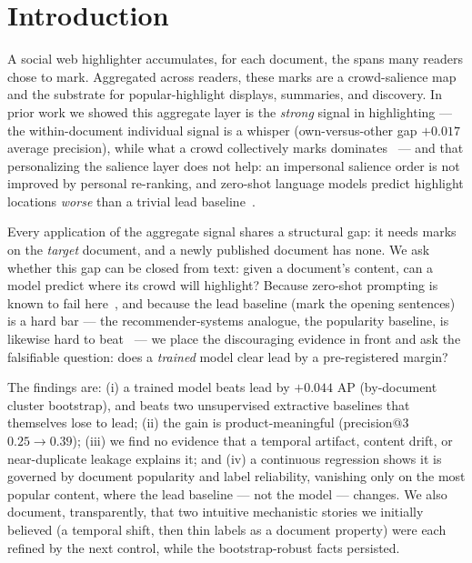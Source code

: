 \documentclass[11pt]{article}
\begin{document}
\section{Introduction}
A social web highlighter accumulates, for each document, the spans many readers chose to mark.
Aggregated across readers, these marks are a crowd-salience map and the substrate for
popular-highlight displays, summaries, and discovery. In prior work we showed this aggregate
layer is the \emph{strong} signal in highlighting --- the within-document individual signal is a
whisper (own-versus-other gap $+0.017$ average precision), while what a crowd collectively marks
dominates~\cite{nakayashiki2026salience} --- and that personalizing the salience layer does not
help: an impersonal salience order is not improved by personal re-ranking, and zero-shot
language models predict highlight locations \emph{worse} than a trivial lead
baseline~\cite{nakayashiki2026selection}.

Every application of the aggregate signal shares a structural gap: it needs marks on the
\emph{target} document, and a newly published document has none. We ask whether this gap can be
closed from text: given a document's content, can a model predict where its crowd will
highlight? Because zero-shot prompting is known to fail here~\cite{nakayashiki2026selection},
and because the lead baseline (mark the opening sentences) is a hard bar --- the
recommender-systems analogue, the popularity baseline, is likewise hard to
beat~\cite{krichene2020,revisitpop2020} --- we place the discouraging evidence in front and ask
the falsifiable question: does a \emph{trained} model clear lead by a pre-registered margin?

The findings are: (i) a trained model beats lead by $+0.044$ AP (by-document cluster bootstrap),
and beats two unsupervised extractive baselines that themselves lose to lead; (ii) the gain is
product-meaningful (precision@3 $0.25\to0.39$); (iii) we find no evidence that a temporal
artifact, content drift, or near-duplicate leakage explains it; and (iv) a continuous regression
shows it is governed by document popularity and label reliability, vanishing only on the most
popular content, where the lead baseline --- not the model --- changes. We also document, transparently,
that two intuitive mechanistic stories we initially believed (a temporal shift, then thin
labels as a document property) were each refined by the next control, while the bootstrap-robust
facts persisted.
\end{document}
